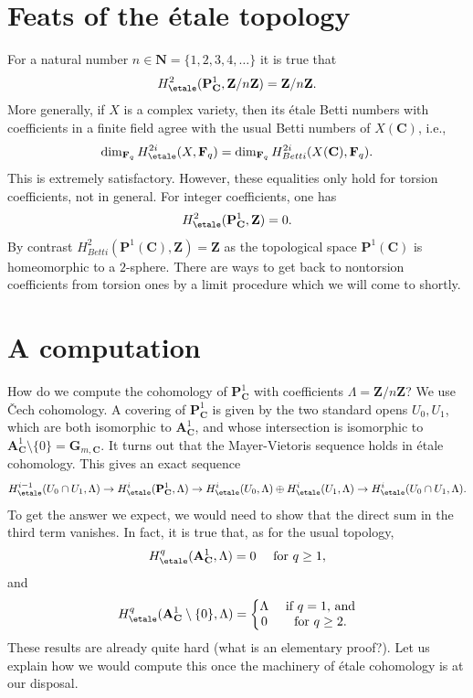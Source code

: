 \section{Feats of the \'etale topology}
\label{etale-cohomology-section-feats}
For a natural number $n \in \mathbf{N} = \{1, 2, 3, 4, \ldots\}$ it is true that
$$
H_\etale^2 (\mathbf{P}^1_\mathbf{C}, \mathbf{Z}/n\mathbf{Z}) =
\mathbf{Z}/n\mathbf{Z}.
$$
More generally, if $X$ is a complex variety, then its \'etale Betti numbers
with coefficients in a finite field agree with the usual Betti numbers of
$X(\mathbf{C})$, i.e.,
$$
\dim_{\mathbf{F}_q} H_\etale^{2i} (X, \mathbf{F}_q) =
\dim_{\mathbf{F}_q} H_{Betti}^{2i} (X(\mathbf{C}), \mathbf{F}_q).
$$
This is extremely satisfactory. However, these equalities only hold for torsion
coefficients, not in general. For integer coefficients, one has
$$
H_\etale^2 (\mathbf{P}^1_\mathbf{C}, \mathbf{Z}) = 0.
$$
By contrast $H_{Betti}^2(\mathbf{P}^1(\mathbf{C}), \mathbf{Z}) = \mathbf{Z}$
as the topological space $\mathbf{P}^1(\mathbf{C})$ is homeomorphic to
a $2$-sphere.
There are ways to get back to nontorsion coefficients from torsion ones by a
limit procedure which we will come to shortly.

\section{A computation}
\label{etale-cohomology-section-computation}
How do we compute the cohomology of $\mathbf{P}^1_\mathbf{C}$ with coefficients
$\Lambda = \mathbf{Z}/n\mathbf{Z}$?
We use {\v C}ech cohomology. A covering of $\mathbf{P}^1_\mathbf{C}$ is given
by the two standard opens $U_0, U_1$, which are both
isomorphic to $\mathbf{A}^1_\mathbf{C}$, and whose intersection is isomorphic
to $\mathbf{A}^1_\mathbf{C} \setminus \{0\} = \mathbf{G}_{m, \mathbf{C}}$.
It turns out that the Mayer-Vietoris sequence holds in \'etale cohomology.
This gives an exact sequence
$$
H_\etale^{i-1}(U_0\cap U_1, \Lambda) \to
H_\etale^i(\mathbf{P}^1_\mathbf{C}, \Lambda) \to
H_\etale^i(U_0, \Lambda) \oplus
H_\etale^i(U_1, \Lambda) \to H_\etale^i(U_0\cap U_1,
\Lambda).
$$
To get the answer we expect, we would need to show that the direct sum in the
third term vanishes. In fact, it is true that, as for the usual topology,
$$
H_\etale^q (\mathbf{A}^1_\mathbf{C}, \Lambda) = 0
\quad \text{ for } q \geq 1,
$$
and
$$
H_\etale^q (\mathbf{A}^1_\mathbf{C} \setminus \{0\}, \Lambda) = \left\{
\begin{matrix}
\Lambda & \text{ if }q = 1\text{, and} \\
0 & \text{ for }q \geq 2.
\end{matrix}
\right.
$$
These results are already quite hard (what is an elementary proof?). Let us
explain how we would compute this once the machinery of \'etale cohomology is
at our disposal.

